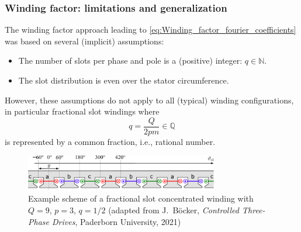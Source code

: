 \begin{frame}
	\frametitle{Winding factor: limitations and generalization}
    The winding factor approach leading to \eqref{eq:Winding_factor_fourier_coefficients} was based on several (implicit) assumptions:
    \begin{itemize}
        \item The number of slots per phase and pole is a (positive) integer: $q \in \mathbb{N}$.
        \item The slot distribution is even over the stator circumference.
    \end{itemize}
    However, these assumptions do not apply to all (typical) winding configurations, in particular fractional slot windings where $$q=\frac{Q}{2 p m} \in \mathbb{Q}$$ is represented by a common fraction, i.e., rational number. 
    \begin{figure}
        \centering
        \includegraphics[width=0.75\textwidth]{fig/lec05/Fractional_slot_concentrated_winding_example.pdf}
        \caption{Example scheme of a fractional slot concentrated winding with $Q=9$, $p = 3$, $q=1/2$ (adapted from J.~B\"ocker, \textit{Controlled Three-Phase Drives}, Paderborn University, 2021)}
        \label{fig:Fractional_slot_concentrated_winding_example}
    \end{figure}
\end{frame}

